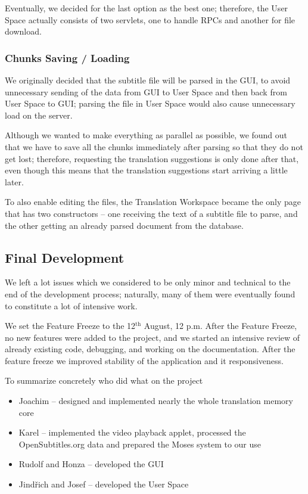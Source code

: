 {Eventually, we decided for the last option as the best one; therefore, the User Space actually consists of two servlets, one to handle RPCs and another for file download.

\subsubsection{Chunks Saving / Loading}

We originally decided that the subtitle file will be parsed in the GUI, 
to avoid unnecessary sending of the data from GUI to User Space and then back from User Space to GUI; parsing the file in User Space would also cause unnecessary load on the server.

Although we wanted to make everything as parallel as possible, we found out that we have to save all the chunks immediately after parsing so that they do not get lost; therefore, requesting the translation suggestions is only done after that, even though this means that the translation suggestions start arriving a little later.

To also enable editing the files, the Translation Workspace became the only page that has two constructors -- one receiving the text of a subtitle file to parse, and the other getting an already parsed document from the database.

\subsection{Final Development}
\label{subsec:final_development}

We left
a lot issues which we considered to be only minor and technical
to the end of the development process;
naturally, many of them were eventually found to constitute a lot of intensive work.

We set the Feature Freeze to the 12$^\mathrm{th}$ August, 12 p.m.
After the Feature Freeze, no new features were added to the project, and 
we started an intensive review of already existing code, debugging, and 
working on the documentation. After the feature freeze we improved 
stability of the application and it responsiveness. 

To summarize concretely who did what on the project
\begin{itemize}
\item Joachim -- designed and implemented nearly the whole translation memory core
\item Karel -- implemented the video playback applet, processed the OpenSubtitles.org data and prepared the Moses system to our use
\item Rudolf and Honza -- developed the GUI
\item Jindřich and Josef -- developed the User Space
\end{itemize}

}
